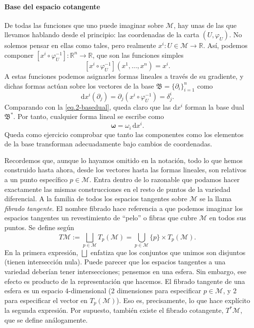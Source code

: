 \paragraph{Base del espacio cotangente} De todas las funciones que uno puede imaginar sobre \(\mathcal{M}\), hay unas de las que llevamos hablando desde el principio: las coordenadas de la carta \((U, \varphi_U)\). No solemos pensar en ellas como tales, pero realmente \(x^i:U\in\mathcal{M}\rightarrow\mathbb{R}\). Así, podemos componer \(\left[x^i\circ\varphi_U^{-1}\right]:\mathbb{R}^n\rightarrow\mathbb{R}\), que son las funciones simples
\begin{equation}
    \left[x^i\circ\varphi_U^{-1}\right]\left(x^1, ..., x^n\right) = x^i.
\end{equation}
A estas funciones podemos asignarles formas lineales a través de su gradiente, y dichas formas actúan sobre los vectores de la base \(\mathfrak{B}=\{\partial_i\}_{i=1}^n\) como
\begin{equation}
    \mathrm{d}x^i\left(\partial_j\right) = \partial_j(x^i\circ\varphi_U^{-1}) = \delta_j^i.
\end{equation}
Comparando con la \cref{eq.2-basedual}, queda claro que las \(\mathrm{d}x^i\) forman la base dual \(\mathfrak{B}^*\). Por tanto, cualquier forma lineal se escribe como
\begin{equation}
    \boldsymbol{\omega} = \omega_i\, \mathrm{d}x^i.
\end{equation}
Queda como ejercicio comprobar que tanto las componentes como los elementos de la base transforman adecuadamente bajo cambios de coordenadas.

Recordemos que, aunque lo hayamos omitido en la notación, todo lo que hemos construido hasta ahora, desde los vectores hasta las formas lineales, son relativos a un punto específico \(p\in\mathcal{M}\). Entra dentro de lo razonable que podamos hacer exactamente las mismas construcciones en el resto de puntos de la variedad diferencial. A la familia de todos los espacios tangentes sobre \(\mathcal{M}\) se la llama \emph{fibrado tangente}. El nombre fibrado hace referencia a que podemos imaginar los espacios tangentes un revestimiento de ``pelo'' o fibras que cubre \(\mathcal{M}\) en todos sus puntos. Se define según
\begin{equation}
    T\mathcal{M} := \bigsqcup_{p\in\mathcal{M}} T_p(\mathcal{M}) = \bigcup_{p\in\mathcal{M}} \{p\}\times T_p(\mathcal{M}).
\end{equation}
En la primera expresión, \(\bigsqcup\) enfatiza que los conjuntos que unimos son disjuntos (tienen intersección nula). Puede parecer que los espacios tangentes a una variedad deberían tener intersecciones; pensemos en una esfera. Sin embargo, ese efecto es producto de la representación que hacemos. El fibrado tangente de una esfera es un espacio 4-dimensional (2 dimensiones para especificar \(p\in\mathcal{M}\), y 2 para especificar el vector en \(T_p(\mathcal{M})\)). Eso es, precisamente, lo que hace explícito la segunda expresión. Por supuesto, también existe el fibrado cotangente, \(T^*\mathcal{M}\), que se define análogamente.

